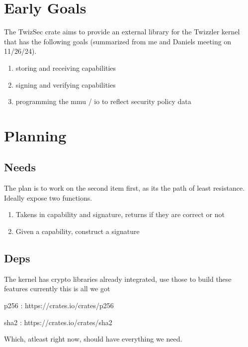 \documentclass{article}
\title{\ASSIGNMENT}
\author{\NAME}
\date{\CLASS}
\begin{document}
\pagestyle{fancy}
\fancyfoot{}
\fancyhead{}
\fancyfoot[L]{\ASSIGNMENT\ -- \CLASS\ -- \NAME}
\fancyfoot[R]{\thepage}

\maketitle


\section{Early Goals}

The TwizSec crate aims to provide an external library for the Twizzler kernel that has
the following goals (summarized from me and Daniels meeting on 11/26/24).
\begin{enumerate}
	\item storing and receiving capabilities
	\item signing and verifying capabilities
	\item programming the mmu / io to reflect security policy data
\end{enumerate}

\section{Planning}


\subsection{Needs}
The plan is to work on the second item first, as its the path of least resistance.
Ideally expose two functions.
\begin{enumerate}
	\item Takens in capability and signature, returns if they are correct or not
	\item Given a capability, construct a signature
\end{enumerate}

\subsection{Deps}
The kernel has crypto libraries already integrated, use those to build these features
currently this is all we got

p256 : https://crates.io/crates/p256

sha2 : https://crates.io/crates/sha2

Which, atleast right now, should have everything we need.
\end{document}
